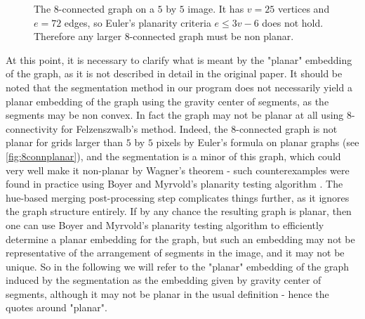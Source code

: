 \begin{figure}[htb!]
\centering
{}
\caption{The $8$-connected graph on a $5$ by $5$ image. It has $v = 25$ vertices and $e = 72$ edges, so Euler's planarity criteria $e \leq 3v - 6$ does not hold. Therefore any larger $8$-connected graph must be non planar.}
\label{fig:8connplanar}
\end{figure}

\begin{remark}
At this point, it is necessary to clarify what is meant by the "planar" embedding of the graph, as it is not described in detail in the original paper. It should be noted that the segmentation method in our program does not necessarily yield a planar embedding of the graph using the gravity center of segments, as the segments may be non convex. In fact the graph may not be planar at all using $8$-connectivity for Felzenszwalb's method. Indeed, the $8$-connected graph is not planar for grids larger than $5$ by $5$ pixels by Euler's formula on planar graphs (see \autoref{fig:8connplanar}), and the segmentation is a minor of this graph, which could very well make it non-planar by Wagner's theorem \cite{wagner1937eigenschaft} - such counterexamples were found in practice using Boyer and Myrvold's planarity testing algorithm \cite{boyer2004cutting}. The hue-based merging post-processing step complicates things further, as it ignores the graph structure entirely. If by any chance the resulting graph is planar, then one can use Boyer and Myrvold's planarity testing algorithm to efficiently determine a planar embedding for the graph, but such an embedding may not be representative of the arrangement of segments in the image, and it may not be unique. So in the following we will refer to the "planar" embedding of the graph induced by the segmentation as the embedding given by gravity center of segments, although it may not be planar in the usual definition - hence the quotes around "planar".
\end{remark}

